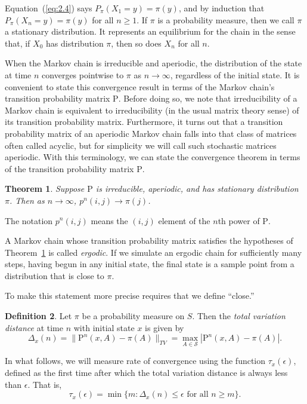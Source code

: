 \documentclass[12pt,letterpaper]{report}
\theoremstyle{plain}
\newtheorem{theorem}{Theorem}[chapter]
\theoremstyle{definition}
\newtheorem{definition}[theorem]{Definition}
\theoremstyle{remark}
\numberwithin{theorem}{chapter}
\numberwithin{claim}{chapter}
\numberwithin{equation}{chapter}
\numberwithin{conjecture}{chapter}
\renewcommand\S{\ensuremath{\mathcal{S}}}
\renewcommand\P{\ensuremath{\mathrm{P}}}
\newcommand\<{\ensuremath{\langle}}
\renewcommand\>{\ensuremath{\rangle}}
\begin{document}
Equation~(\ref{eq:2.4}) says $P_\pi(X_1 = y) = \pi(y)$, 
and by induction that $P_\pi(X_n = y) = \pi(y)$ for all $n \geq 1$. 
If $\pi$ is a probability measure, then we call $\pi$ a stationary distribution. It
represents an equilibrium for the chain in the sense that, if $X_0$ has
distribution $\pi$, then so does $X_n$ for all $n$.

When the Markov chain is irreducible and aperiodic, the distribution of the state at time
$n$ converges pointwise to $\pi$ as $n \rightarrow \infty$, regardless of the
initial state. It is convenient to state this convergence result in terms of the
Markov chain's transition probability matrix $\P$. Before doing so, we note that
irreducibility of a Markov chain is equivalent to irreducibility (in the usual 
matrix theory sense) of its transition probability matrix. Furthermore, it turns
out that a transition probability matrix of an aperiodic Markov chain falls into
that class of matrices often called acyclic, but for simplicity we will call
such stochastic matrices aperiodic. With this terminology, we can state the
convergence theorem in terms of the transition probability matrix \P. 

\begin{theorem}
\label{thm-2.1.1}
Suppose $\P$ is irreducible, aperiodic, and has stationary distribution
$\pi$. Then as $n\rightarrow \infty$, $p^n(i,j) \rightarrow \pi(j)$.
\end{theorem}

The notation $p^n(i,j)$ means the $(i,j)$ element of the $n$th power of $\P$.

A Markov chain whose transition probability matrix satisfies the hypotheses of
Theorem~\ref{thm-2.1.1} is called \emph{ergodic}. If we simulate an ergodic chain for
sufficiently many steps, having 
%
%
%
%
%
%
begun in any initial state, the final state is a sample point from a
distribution that is close to $\pi$. 

To make this statement more precise requires that we define ``close.''
\begin{definition}
Let $\pi$ be a probability measure on $S$. Then the \emph{total variation distance} at time
$n$ with initial state $x$ is given by 
\[
\Delta_x(n) = \|\P^n(x, A) - \pi(A)\|_{TV} = \max_{A\in \S} | \P^n(x,A)-\pi(A)|.
\]
\end{definition}
In what follows, we will measure rate of convergence using the function
$\tau_x(\epsilon)$, defined as the first time after which the total variation
distance is always less than $\epsilon$. That is, 
\[
\tau_x(\epsilon) = \min\{m : \Delta_x(n) \leq \epsilon \text{ for all } n\geq
m\}.
\]
\end{document}
